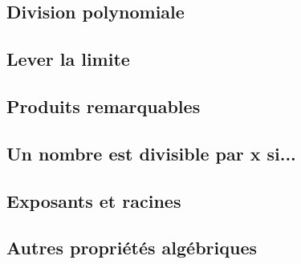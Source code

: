 \documentclass[a4paper]{article}
\begin{document}
    \subsection{Division polynomiale}
    \subsection{Lever la limite}
    \subsection{Produits remarquables}
    \subsection{Un nombre est divisible par x si...}
    \subsection{Exposants et racines}
    \subsection{Autres propriétés algébriques}
\end{document}
